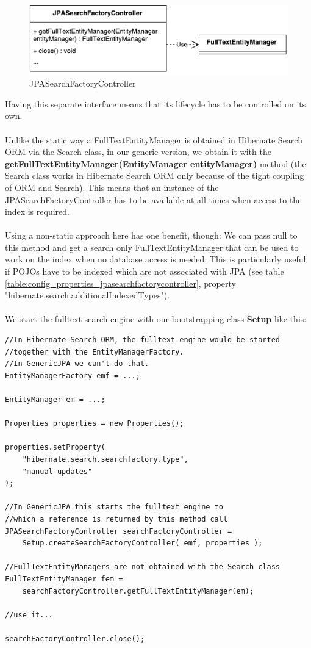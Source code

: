 \begin{figure}[ht]
	\centering
	\includegraphics[scale=0.6]{images/JPASearchFactoryController.pdf}
	\caption{JPASearchFactoryController}
	\label{jpa_searchfactory_controller}
\end{figure}
\noindent
Having this separate interface means that its lifecycle has to be controlled on its own.
\\\\
Unlike the static way a FullTextEntityManager is obtained in Hibernate Search ORM via the Search class, in our generic version, we obtain it with the \textbf{getFullTextEntityManager(EntityManager entityManager)} method (the Search class works in Hibernate Search ORM only because of the tight coupling of ORM and Search). This means that an instance of the JPASearchFactoryController has to be available at all times when access to the index is required.
\\\\
Using a non-static approach here has one benefit, though: We can pass null to this method and get a search only FullTextEntityManager that can be used to work on the index when no database access is needed. This is particularly useful if POJOs have to be indexed which are not associated with JPA (see table \ref{table:config_properties_jpasearchfactorycontroller}, property "hibernate.search.additionalIndexedTypes").
\\\\
We start the fulltext search engine with our bootstrapping class \textbf{Setup} like this:
\\
\lstset{language=java}
\begin{lstlisting}[frame=htrbl, caption={MassIndexer usage with Hibernate Search ORM}, label={lst:massindexing_hsearch_orm.java}]
//In Hibernate Search ORM, the fulltext engine would be started 
//together with the EntityManagerFactory.
//In GenericJPA we can't do that.
EntityManagerFactory emf = ...;

EntityManager em = ...;

Properties properties = new Properties();

properties.setProperty(
	"hibernate.search.searchfactory.type", 
	"manual-updates"
);

//In GenericJPA this starts the fulltext engine to 
//which a reference is returned by this method call
JPASearchFactoryController searchFactoryController =
	Setup.createSearchFactoryController( emf, properties );

//FullTextEntityManagers are not obtained with the Search class
FullTextEntityManager fem = 
	searchFactoryController.getFullTextEntityManager(em);

//use it...

searchFactoryController.close();
\end{lstlisting}
